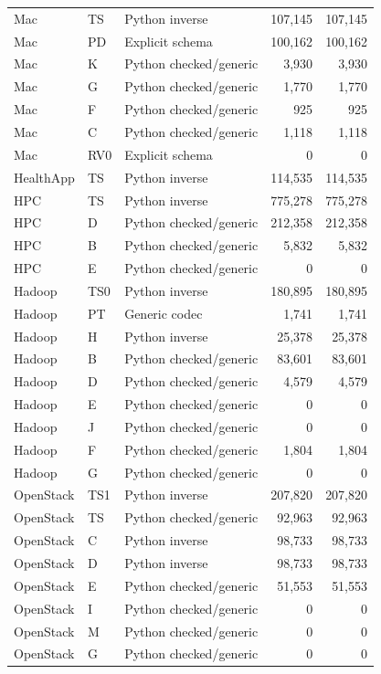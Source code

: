 \begin{longtable}{lllrr}
Mac & TS & Python inverse & 107,145 & 107,145 \\
Mac & PD & Explicit schema & 100,162 & 100,162 \\
Mac & K & Python checked/generic & 3,930 & 3,930 \\
Mac & G & Python checked/generic & 1,770 & 1,770 \\
Mac & F & Python checked/generic & 925 & 925 \\
Mac & C & Python checked/generic & 1,118 & 1,118 \\
Mac & RV0 & Explicit schema & 0 & 0 \\
HealthApp & TS & Python inverse & 114,535 & 114,535 \\
HPC & TS & Python inverse & 775,278 & 775,278 \\
HPC & D & Python checked/generic & 212,358 & 212,358 \\
HPC & B & Python checked/generic & 5,832 & 5,832 \\
HPC & E & Python checked/generic & 0 & 0 \\
Hadoop & TS0 & Python inverse & 180,895 & 180,895 \\
Hadoop & PT & Generic codec & 1,741 & 1,741 \\
Hadoop & H & Python inverse & 25,378 & 25,378 \\
Hadoop & B & Python checked/generic & 83,601 & 83,601 \\
Hadoop & D & Python checked/generic & 4,579 & 4,579 \\
Hadoop & E & Python checked/generic & 0 & 0 \\
Hadoop & J & Python checked/generic & 0 & 0 \\
Hadoop & F & Python checked/generic & 1,804 & 1,804 \\
Hadoop & G & Python checked/generic & 0 & 0 \\
OpenStack & TS1 & Python inverse & 207,820 & 207,820 \\
OpenStack & TS & Python checked/generic & 92,963 & 92,963 \\
OpenStack & C & Python inverse & 98,733 & 98,733 \\
OpenStack & D & Python inverse & 98,733 & 98,733 \\
OpenStack & E & Python checked/generic & 51,553 & 51,553 \\
OpenStack & I & Python checked/generic & 0 & 0 \\
OpenStack & M & Python checked/generic & 0 & 0 \\
OpenStack & G & Python checked/generic & 0 & 0 \\

\end{longtable}
